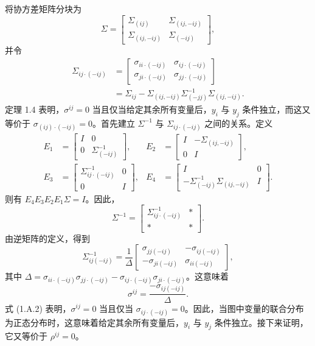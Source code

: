 \begin{bookproof}
将协方差矩阵分块为
\[
\Sigma=
\begin{bmatrix}
\Sigma_{(ij)} & \Sigma_{(ij,-ij)} \\
\Sigma_{(ij,-ij)} & \Sigma_{(-ij)}
\end{bmatrix},
\]
并令
\[
\begin{aligned}
\Sigma_{ij\cdot(-ij)}
&=\begin{bmatrix}
\sigma_{ii\cdot(-ij)} & \sigma_{ij\cdot(-ij)} \\
\sigma_{ji\cdot(-ij)} & \sigma_{jj\cdot(-ij)}
\end{bmatrix} \\
&=\Sigma_{ij}-\Sigma_{(ij,-ij)}\Sigma^{-1}_{(-jj)}\Sigma_{(ij,-ij)}.
\end{aligned}
\]
定理 1.4 表明，$\sigma^{ij}=0$ 当且仅当给定其余所有变量后，$y_i$ 与 $y_j$ 条件独立，而这又等价于 $\sigma_{(ij)\cdot(-ij)}=0$。首先建立 $\Sigma^{-1}$ 与 $\Sigma_{ij\cdot(-ij)}$ 之间的关系。定义
\[
\begin{aligned}
E_1&=\begin{bmatrix}I&0\\0&\Sigma^{-1}_{(-ij)}\end{bmatrix},
&E_2&=\begin{bmatrix}I&-\Sigma_{(ij,-ij)}\\0&I\end{bmatrix}, \\[3pt]
E_3&=\begin{bmatrix}\Sigma^{-1}_{ij\cdot(-ij)}&0\\0&I\end{bmatrix},
&E_4&=\begin{bmatrix}I&0\\-\Sigma^{-1}_{(-ij)}\Sigma_{(ij,-ij)}&I\end{bmatrix}.
\end{aligned}
\]
则有 $E_4E_3E_2E_1\Sigma=I$。因此，
\[
\Sigma^{-1}=\begin{bmatrix}\Sigma^{-1}_{ij\cdot(-ij)}&*\\ *&*\end{bmatrix}.
\]
由逆矩阵的定义，得到
\begin{equation}
\Sigma^{-1}_{ij(-ij)}=
\frac{1}{\Delta}
\begin{bmatrix}
\sigma_{jj(-ij)} & -\sigma_{ij(-ij)} \\
-\sigma_{ji(-ij)} & \sigma_{ii(-ij)}
\end{bmatrix},
\tag{1.A.1}
\end{equation}
其中 $\Delta=\sigma_{ii\cdot(-ij)}\sigma_{jj\cdot(-ij)}-\sigma_{ij\cdot(-ij)}\sigma_{ji\cdot(-ij)}$。这意味着
\begin{equation}
\sigma^{ij}=\frac{-\sigma_{ij(-ij)}}{\Delta}.
\tag{1.A.2}
\end{equation}
式 (1.A.2) 表明，$\sigma^{ij}=0$ 当且仅当 $\sigma_{ij\cdot(-ij)}=0$。因此，当图中变量的联合分布为正态分布时，这意味着给定其余所有变量后，$y_i$ 与 $y_j$ 条件独立。接下来证明，它又等价于 $\rho^{ij}=0$。


\end{bookproof}
